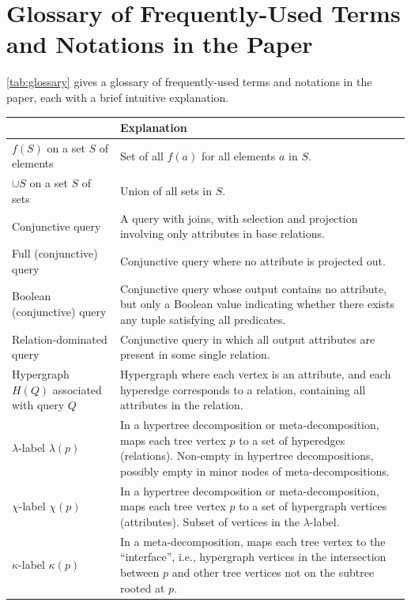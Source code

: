 \section{Glossary of Frequently-Used Terms and Notations in the Paper}
\label{app:glossary}
\cref{tab:glossary} gives a glossary of frequently-used terms and notations in the paper, each with a brief intuitive explanation.
\begin{small}
\begin{table}[H]
    \centering
    \begin{tabular}{>{\raggedright\arraybackslash}p{3.5cm}>{\raggedright\arraybackslash}p{9.5cm}}
        \hline
        {\bf Term / Notation} & {\bf Explanation} \\ \hline
        $f(S)$ on a set $S$ of elements & Set of all $f(a)$ for all elements $a$ in $S$. \\ \hline
        $\cup S$ on a set $S$ of sets & Union of all sets in $S$. \\ \hline
        Conjunctive query & A query with joins, with selection and projection involving only attributes in base relations. \\ \hline
        Full (conjunctive) query & Conjunctive query where no attribute is projected out. \\ \hline
        Boolean (conjunctive) query & Conjunctive query whose output contains no attribute, but only a Boolean value indicating whether there exists any tuple satisfying all predicates. \\ \hline
        Relation-dominated query & Conjunctive query in which all output attributes are present in some single relation. \\ \hline
        Hypergraph $H(Q)$ associated with query $Q$ & Hypergraph where each vertex is an attribute, and each hyperedge corresponds to a relation, containing all attributes in the relation. \\ \hline
        $\lambda$-label $\lambda(p)$ & In a hypertree decomposition or meta-decomposition, maps each tree vertex $p$ to a set of hyperedges (relations). Non-empty in hypertree decompositions, possibly empty in minor nodes of meta-decompositions. \\ \hline
        $\chi$-label $\chi(p)$ & In a hypertree decomposition or meta-decomposition, maps each tree vertex $p$ to a set of hypergraph vertices (attributes). Subset of vertices in the $\lambda$-label. \\ \hline
        $\kappa$-label $\kappa(p)$ & In a meta-decomposition, maps each tree vertex to the ``interface'', i.e., hypergraph vertices in the intersection between $p$ and other tree vertices not on the subtree rooted at $p$. \\ \hline

\end{tabular}
\end{table}
\end{small}
